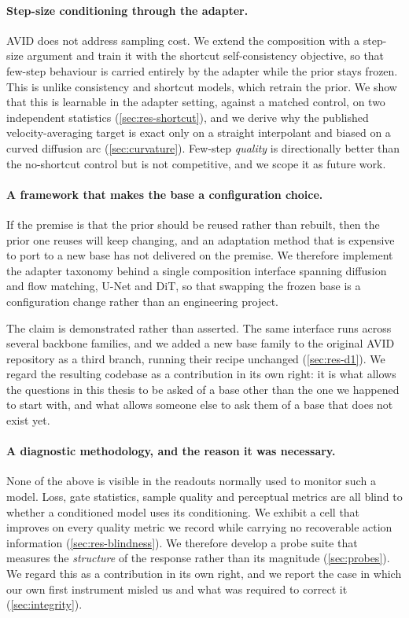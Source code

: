 \paragraph{Step-size conditioning through the adapter.} AVID does not
address sampling cost. We extend the composition with a step-size argument
and train it with the shortcut self-consistency objective, so that few-step
behaviour is carried entirely by the adapter while the prior stays frozen.
This is unlike consistency and shortcut models, which retrain the prior. We
show
that this is learnable in the adapter setting, against a matched control, on
two independent statistics (\cref{sec:res-shortcut}), and we derive why the
published velocity-averaging target is exact only on a straight interpolant
and biased on a curved diffusion arc (\cref{sec:curvature}). Few-step
\emph{quality} is directionally better than the no-shortcut control but is
not competitive, and we scope it as future work.

\paragraph{A framework that makes the base a configuration choice.} If the
premise is that the prior should be reused rather than rebuilt, then the
prior one reuses will keep changing, and an adaptation method that is
expensive to port to a new base has not delivered on the premise. We
therefore implement the adapter taxonomy behind a single composition
interface spanning diffusion and flow matching, U-Net and DiT, so that
swapping the frozen base is a configuration change rather than an
engineering project.

The claim is demonstrated rather than asserted. The same interface runs
across several backbone families, and we added a new base family to the
original AVID repository as a third branch, running their recipe unchanged
(\cref{sec:res-d1}). We regard the resulting codebase as a contribution in
its own right: it is what allows the questions in this thesis to be asked of
a base other than the one we happened to start with, and what allows someone
else to ask them of a base that does not exist yet.

\paragraph{A diagnostic methodology, and the reason it was necessary.} None
of the above is visible in the readouts normally used to monitor such a
model. Loss, gate statistics, sample quality and perceptual metrics are all
blind to whether a conditioned model uses its conditioning. We exhibit a
cell that improves on every quality metric we record while carrying no
recoverable action information (\cref{sec:res-blindness}). We therefore
develop a probe suite that measures the \emph{structure} of the response
rather than its magnitude (\cref{sec:probes}). We regard this as a
contribution in its own right, and we report the case in which our own first
instrument misled us and what was required to correct it
(\cref{sec:integrity}).

